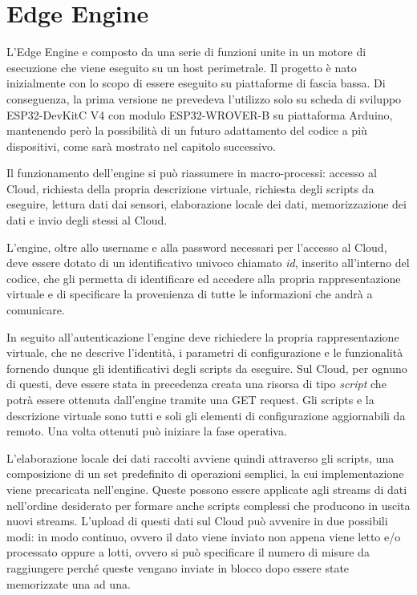 \section{Edge Engine}
L'Edge Engine e composto da una serie di funzioni unite in un motore di esecuzione che viene eseguito su un host perimetrale. Il progetto è nato inizialmente con lo scopo di essere eseguito su piattaforme di fascia bassa. Di conseguenza, la prima versione ne prevedeva l’utilizzo solo su scheda di sviluppo ESP32-DevKitC V4 con modulo ESP32-WROVER-B su piattaforma Arduino, mantenendo però la possibilità di un futuro adattamento del codice a più dispositivi, come sarà mostrato nel capitolo successivo.

Il funzionamento dell'engine si può riassumere in macro-processi: accesso al Cloud, richiesta della propria descrizione virtuale, richiesta degli scripts da eseguire, lettura dati dai sensori, elaborazione locale dei dati, memorizzazione dei dati e invio degli stessi al Cloud.

L’engine, oltre allo username e alla password necessari per l’accesso al Cloud, deve essere dotato di un identificativo univoco chiamato \textit{id}, inserito all'interno del codice, che gli permetta di identificare ed accedere alla propria rappresentazione virtuale e di specificare la provenienza di tutte le informazioni che andrà a comunicare.

In seguito all'autenticazione l'engine deve richiedere la propria rappresentazione virtuale, che ne descrive l'identità, i parametri di configurazione e le funzionalità fornendo dunque gli identificativi degli scripts da eseguire. Sul Cloud, per ognuno di questi, deve essere stata in precedenza creata una risorsa di tipo \textit{script} che potrà essere ottenuta dall’engine tramite una GET request. Gli scripts e la descrizione virtuale sono tutti e soli gli elementi di configurazione aggiornabili da remoto. Una volta ottenuti può iniziare la fase operativa.

L’elaborazione locale dei dati raccolti avviene quindi attraverso gli scripts, una composizione di un set predefinito di operazioni semplici, la cui implementazione viene precaricata nell'engine. Queste possono essere applicate agli streams di dati nell'ordine desiderato per formare anche scripts complessi che producono in uscita nuovi streams. L'upload di questi dati sul Cloud può avvenire in due possibili modi: in modo continuo, ovvero il dato viene inviato non appena viene letto e/o processato oppure a lotti, ovvero si può specificare il numero di misure da raggiungere perché queste vengano inviate in blocco dopo essere state memorizzate una ad una.

